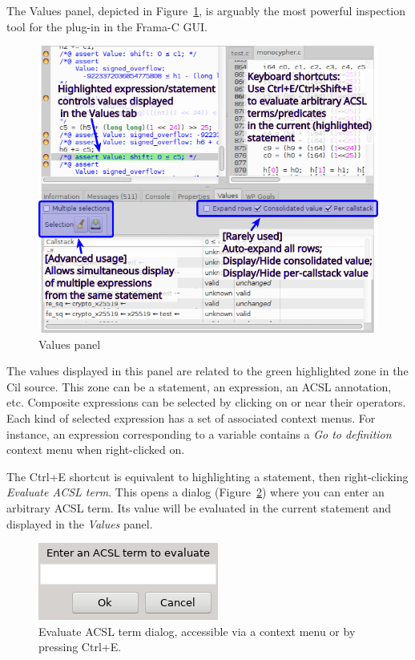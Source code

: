The Values panel, depicted in Figure~\ref{fig:values-panel}, is arguably
the most powerful inspection tool for the \Eva{} plug-in in the Frama-C GUI.

\begin{figure}[hbtp]
\centering
\includegraphics[width=\textwidth]{gui-images/gui-values-annotated.png}
\caption{Values panel}
\label{fig:values-panel}
\end{figure}

The values displayed in this panel are related to the green highlighted
zone in the Cil source. This zone can be a statement, an expression,
an ACSL annotation, etc. Composite expressions can be selected by clicking
on or near their operators. Each kind of selected expression has a set
of associated context menus. For instance, an expression corresponding
to a variable contains a \emph{Go to definition} context menu when
right-clicked on.

The Ctrl+E shortcut is equivalent to highlighting a statement, then
right-clicking \emph{Evaluate ACSL term}. This opens a dialog
(Figure~\ref{fig:eval-acsl}) where you can enter an arbitrary ACSL
term. Its value will be evaluated in the current statement and
displayed in the \emph{Values} panel.

\begin{figure}[!hbtp]
\centering
\includegraphics[scale=0.7]{gui-images/eval-acsl.png}
\caption{Evaluate ACSL term dialog, accessible via a context menu or
  by pressing Ctrl+E.}
\label{fig:eval-acsl}
\end{figure}

